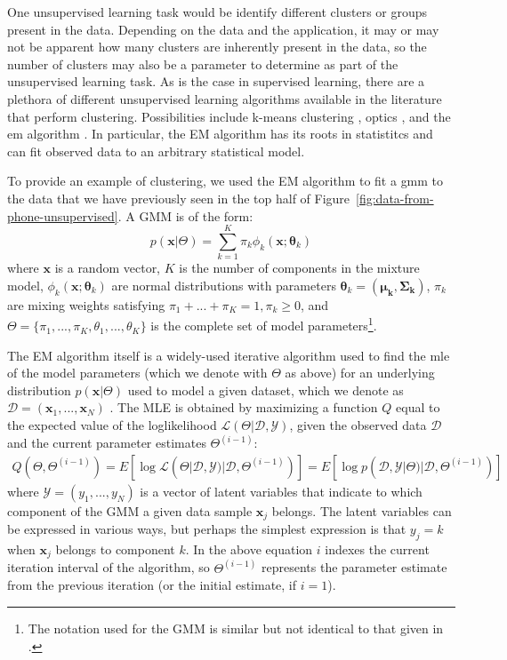 One unsupervised learning task would be identify different clusters or groups present in the data. Depending on the data and the application, it may or may not be apparent how many clusters are inherently present in the data, so the number of clusters may also be a parameter to determine as part of the unsupervised learning task. As is the case in supervised learning, there are a plethora of different unsupervised learning algorithms available in the literature that perform clustering. Possibilities include k-means clustering \cite{hartigan1979algorithm}, \acrshort{optics} \cite{Ankerst:1999:OOP:304181.304187}, and the \gls{em} algorithm \cite{dempster1977maximum}. In particular, the EM algorithm has its roots in statistitcs and can fit observed data to an arbitrary statistical model.

To provide an example of clustering, we used the EM algorithm to fit a \gls{gmm} to the data that we have previously seen in the top half of Figure~\ref{fig:data-from-phone-unsupervised}. A GMM is of the form:
%
\begin{equation}
 p(\mathbf{x}|\Theta) = \sum\limits_{k=1}^K \pi_k \phi_k(\mathbf{x}; \boldsymbol{\theta}_k)
\end{equation}
%
where $\mathbf{x}$ is a random vector, $K$ is the number of components in the mixture model, $\phi_k(\mathbf{x}; \boldsymbol{\theta}_k)$ are normal distributions with parameters $\boldsymbol{\theta}_k = (\boldsymbol{\mu_k}, \mathbf{\Sigma_k})$, $\pi_k$ are mixing weights satisfying $\pi_1 + ... + \pi_K = 1, \pi_k \geq 0$, and $\Theta = \{\pi_1,...,\pi_K,\theta_1, ..., \theta_K\}$ is the complete set of model parameters\footnote{The notation used for the GMM is similar but not identical to that given in \cite{bilmes1998gentle}.}.

The EM algorithm itself is a widely-used iterative algorithm used to find the \gls{mle} of the model parameters (which we denote with $\Theta$ as above) for an underlying distribution $p(\mathbf{x}|\Theta)$ used to model a given dataset, which we denote as $\mathcal{D} = (\mathbf{x}_1,..., \mathbf{x}_N)$ \cite{bilmes1998gentle}. The MLE is obtained by maximizing a function $Q$ equal to the expected value of the loglikelihood $\mathcal{L}(\Theta|\mathcal{D},\mathcal{Y})$, given the observed data $\mathcal{D}$ and the current parameter estimates $\Theta^{(i-1)}$:
%
\begin{gather}
  Q(\Theta,\Theta^{(i-1)}) = E[\log \mathcal{L}(\Theta|\mathcal{D}, \mathcal{Y})|\mathcal{D},\Theta^{(i-1)})]
     = E[\log p(\mathcal{D}, \mathcal{Y}|\Theta)|\mathcal{D},\Theta^{(i-1)})]
\end{gather}
%
where $\mathcal{Y} = (y_1, ..., y_N)$ is a vector of latent variables that indicate to which component of the GMM a given data sample $\mathbf{x}_j$ belongs. The latent variables can be expressed in various ways, but perhaps the simplest expression is that $y_j = k$ when $\mathbf{x}_j$ belongs to component $k$. In the above equation $i$ indexes the current iteration interval of the algorithm, so $\Theta^{(i-1)}$ represents the parameter estimate from the previous iteration (or the initial estimate, if $i=1$).

